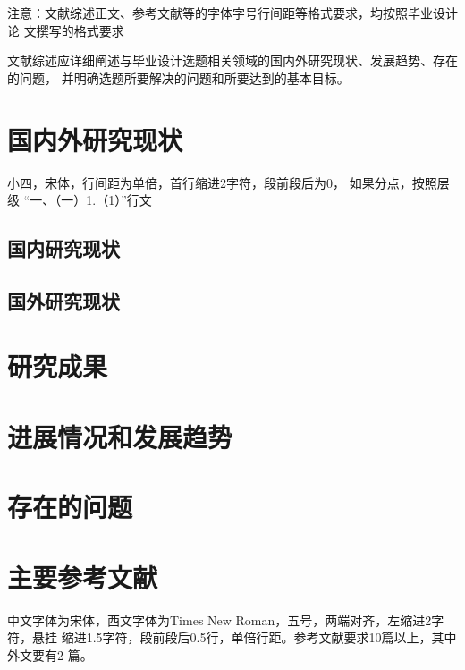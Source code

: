 \begin{tcolorbox}
    注意：文献综述正文、参考文献等的字体字号行间距等格式要求，均按照毕业设计论
    文撰写的格式要求
\end{tcolorbox}

文献综述应详细阐述与毕业设计选题相关领域的国内外研究现状、发展趋势、存在的问题，
并明确选题所要解决的问题和所要达到的基本目标。

\section{国内外研究现状}

\begin{tcolorbox}
    小四，宋体，行间距为单倍，首行缩进2字符，段前段后为0， 如果分点，按照层级
    “一、（一）1.（1）”行文
\end{tcolorbox}

\subsection{国内研究现状}

\lipsum[1]\cite{Bohan1928,chen1980zhongguo}

\subsection{国外研究现状}

\lipsum[2]

\section{研究成果}

\lipsum[2-4]\cite{chen2005zhulu,chu2004tushu,yuan2012lanc}

\section{进展情况和发展趋势}

\lipsum[5-7]\cite{lamport1986document,niu2013zonghe}

\section{存在的问题}

\lipsum[8-11]\cite{wikibook2014latex,Dubrovin1906,hls2012jinji}

\section{主要参考文献}

\begin{tcolorbox}
    中文字体为宋体，西文字体为Times New Roman，五号，两端对齐，左缩进2字符，悬挂
    缩进1.5字符，段前段后0.5行，单倍行距。参考文献要求10篇以上，其中外文要有2
    篇。
\end{tcolorbox}

